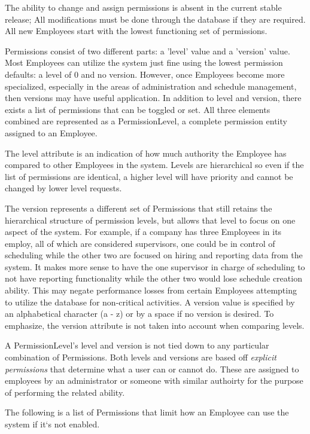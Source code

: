 \documentclass[a4paper,10pt]{report}
\begin{document}
\begin{footnotesize}
\par \noindent \hspace*{1cm} The ability to change and assign permissions is absent in the current stable release; All modifications must be done through the database if they are required. All new Employees start with the lowest functioning set of permissions.
\end{footnotesize}
\bigskip
\par \noindent \hspace*{1cm} Permissions consist of two different parts: a 'level' value and a 'version' value. Most Employees can utilize the system just fine using the lowest permission defaults: a level of 0 and no version. However, once Employees become more specialized, especially in the areas of administration and schedule management, then versions may have useful application. In addition to level and version, there exists a list of permissions that can be toggled or set. All three elements combined are represented as a PermissionLevel, a complete permission entity assigned to an Employee.
\bigskip
\par \noindent \hspace*{1cm} The level attribute is an indication of how much authority the Employee has compared to other Employees in the system. Levels are hierarchical so even if the list of permissions are identical, a higher level will have priority and cannot be changed by lower level requests. 
\bigskip
\par \noindent \hspace*{1cm} The version represents a different set of Permissions that still retains the hierarchical structure of permission levels, but allows that level to focus on one aspect of the system. For example, if a company has three Employees in its employ, all of which are considered supervisors, one could be in control of scheduling while the other two are focused on hiring and reporting data from the system. It makes more sense to have the one supervisor in charge of scheduling to not have reporting functionality while the other two would lose schedule creation ability. This may negate performance losses from certain Employees attempting to utilize the database for non-critical activities. A version value is specified by an alphabetical character (a - z) or by a space if no version is desired. To emphasize, the version attribute is not taken into account when comparing levels.
\newpage
\par \noindent \hspace*{1cm} A PermissionLevel's level and version is not tied down to any particular combination of Permissions. Both levels and versions are based off \textit{explicit permissions} that determine what a user can or cannot do. These are assigned to employees by an administrator or someone with similar authoirty for the purpose of performing the related ability.
\par \noindent \hspace*{1cm} The following is a list of Permissions that limit how an Employee can use the system if it`s not enabled.
\end{document}
